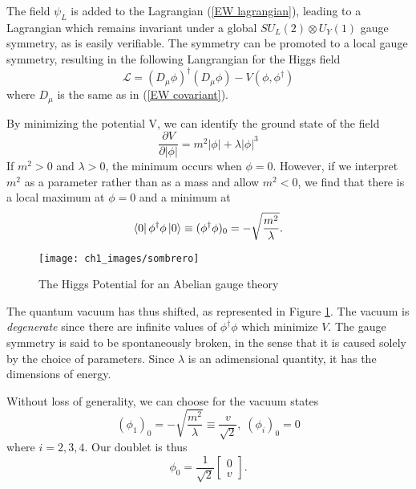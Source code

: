 \documentclass[10pt,a4paper]{book}
\begin{document}
The field $\psi_L$ is added to the Lagrangian (\ref{EW lagrangian}), leading to a Lagrangian which remains invariant under a global $SU_L(2)\otimes U_Y(1)$ gauge symmetry, as is easily verifiable. The symmetry can be promoted to a local gauge symmetry, resulting in the following Langrangian for the Higgs field
\begin{equation}
\mathcal{L} = (D_\mu\phi)^\dagger(D_\mu\phi) - V(\phi,\phi^\dagger)
\end{equation}
where $D_\mu$ is the same as in (\ref{EW covariant}).


By minimizing the potential V, we can identify the ground state of the field
\begin{equation}
\frac{\partial V}{\partial \vert \phi \vert} = m^2\vert \phi \vert + \lambda\vert\phi\vert^3 
\end{equation}
If $m^2 > 0$ and $\lambda > 0$, the minimum occurs when $\phi = 0$. However, if we interpret $m^2$ as a parameter rather than as a mass and allow $m^2 < 0$, we find that there is a local maximum at $\phi = 0$ and a minimum at 
\begin{equation}
\bra{0}\phi^\dagger \phi\ket{0} \equiv (\phi^\dagger\phi)_0 = -\sqrt{\frac{m^2}{\lambda}}.
\end{equation}

\begin{figure}
\centering
\texttt{[image: ch1\_images/sombrero]}
\caption{The Higgs Potential for an Abelian gauge theory}
\label{Higgs Potential}
\end{figure}
The quantum vacuum has thus shifted, as represented in Figure \ref{Higgs Potential}. The vacuum is \emph{degenerate} since there are infinite values of $\phi^\dagger\phi$ which minimize $V$. The gauge symmetry is said to be spontaneously broken, in the sense that it is caused solely by the choice of parameters. Since $\lambda$ is an adimensional quantity, it has the dimensions of energy.

Without loss of generality, we can choose for the vacuum states
\begin{equation}
(\phi_1)_0 = -\sqrt{\frac{m^2}{\lambda}} \equiv \frac{v}{\sqrt{2}}, \; (\phi_i)_0 = 0
\end{equation}
where $i = 2,3,4$.
Our doublet is thus
\begin{equation}
\phi_0 = \frac{1}{\sqrt{2}}\begin{bmatrix}
0 \\
v
\end{bmatrix}.
\end{equation}
\end{document}
